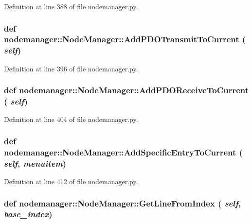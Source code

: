 Definition at line 388 of file nodemanager.py.\hypertarget{classnodemanager_1_1NodeManager_359cb64658d554454b8bfa18723f6f86}{
\subsubsection[AddPDOTransmitToCurrent]{\setlength{\rightskip}{0pt plus 5cm}def nodemanager::Node\-Manager::Add\-PDOTransmit\-To\-Current ( {\em self})}}
\label{classnodemanager_1_1NodeManager_359cb64658d554454b8bfa18723f6f86}




Definition at line 396 of file nodemanager.py.\hypertarget{classnodemanager_1_1NodeManager_dc455012736c8481f95ff1036deb8c0b}{
\subsubsection[AddPDOReceiveToCurrent]{\setlength{\rightskip}{0pt plus 5cm}def nodemanager::Node\-Manager::Add\-PDOReceive\-To\-Current ( {\em self})}}
\label{classnodemanager_1_1NodeManager_dc455012736c8481f95ff1036deb8c0b}




Definition at line 404 of file nodemanager.py.\hypertarget{classnodemanager_1_1NodeManager_289765dcb04f19d8aba773c3ce2171c1}{
\subsubsection[AddSpecificEntryToCurrent]{\setlength{\rightskip}{0pt plus 5cm}def nodemanager::Node\-Manager::Add\-Specific\-Entry\-To\-Current ( {\em self},  {\em menuitem})}}
\label{classnodemanager_1_1NodeManager_289765dcb04f19d8aba773c3ce2171c1}




Definition at line 412 of file nodemanager.py.\hypertarget{classnodemanager_1_1NodeManager_f3f718df6b3db1b68aee3c357cc722bd}{
\subsubsection[GetLineFromIndex]{\setlength{\rightskip}{0pt plus 5cm}def nodemanager::Node\-Manager::Get\-Line\-From\-Index ( {\em self},  {\em base\_\-index})}}
\label{classnodemanager_1_1NodeManager_f3f718df6b3db1b68aee3c357cc722bd}




